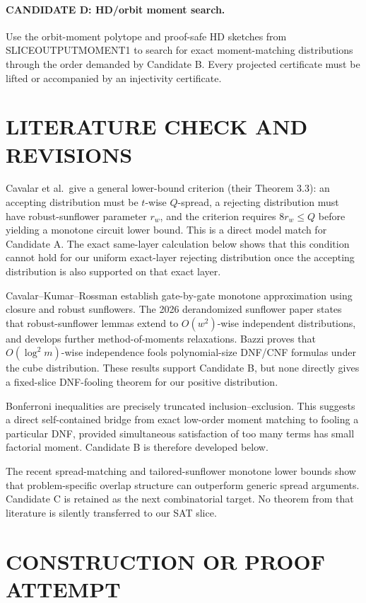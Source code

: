 \documentclass[11pt]{article}
\begin{document}
\paragraph{CANDIDATE D: HD/orbit moment search.}
Use the orbit-moment polytope and proof-safe HD sketches from SLICEOUTPUTMOMENT1 to search for exact moment-matching distributions through the order demanded by Candidate B. Every projected certificate must be lifted or accompanied by an injectivity certificate.

\section{LITERATURE CHECK AND REVISIONS}
Cavalar et al.\ give a general lower-bound criterion (their Theorem 3.3): an accepting distribution must be $t$-wise $Q$-spread, a rejecting distribution must have robust-sunflower parameter $r_w$, and the criterion requires $8r_w\le Q$ before yielding a monotone circuit lower bound. This is a direct model match for Candidate A. The exact same-layer calculation below shows that this condition cannot hold for our uniform exact-layer rejecting distribution once the accepting distribution is also supported on that exact layer.

Cavalar--Kumar--Rossman establish gate-by-gate monotone approximation using closure and robust sunflowers. The 2026 derandomized sunflower paper states that robust-sunflower lemmas extend to $O(w^2)$-wise independent distributions, and develops further method-of-moments relaxations. Bazzi proves that $O(\log^2 m)$-wise independence fools polynomial-size DNF/CNF formulas under the cube distribution. These results support Candidate B, but none directly gives a fixed-slice DNF-fooling theorem for our positive distribution.

Bonferroni inequalities are precisely truncated inclusion--exclusion. This suggests a direct self-contained bridge from exact low-order moment matching to fooling a particular DNF, provided simultaneous satisfaction of too many terms has small factorial moment. Candidate B is therefore developed below.

The recent spread-matching and tailored-sunflower monotone lower bounds show that problem-specific overlap structure can outperform generic spread arguments. Candidate C is retained as the next combinatorial target. No theorem from that literature is silently transferred to our SAT slice.

\section{CONSTRUCTION OR PROOF ATTEMPT}
\end{document}
